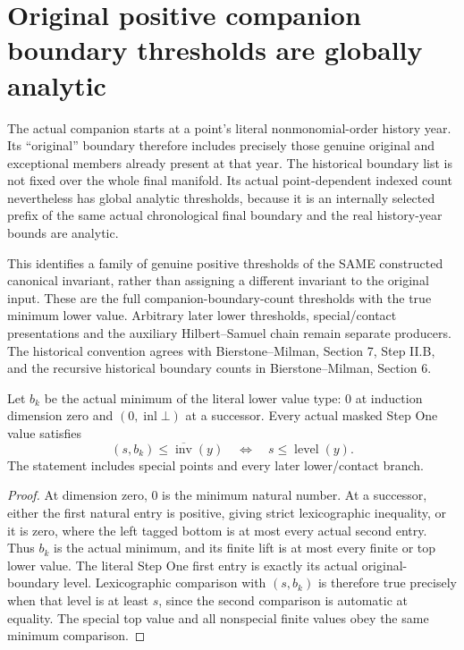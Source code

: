 \section{Original positive companion boundary thresholds are globally analytic}

The actual companion starts at a point's literal nonmonomial-order history
year. Its ``original'' boundary therefore includes precisely those genuine
original and exceptional members already present at that year. The historical
boundary list is not fixed over the whole final manifold. Its actual
point-dependent indexed count nevertheless has global analytic thresholds,
because it is an internally selected prefix of the same actual chronological
final boundary and the real history-year bounds are analytic.

This identifies a family of genuine positive thresholds of the SAME constructed
canonical invariant, rather than assigning a different invariant to the original
input. These are the full companion-boundary-count thresholds with the true
minimum lower value. Arbitrary later lower thresholds, special/contact
presentations and the auxiliary Hilbert--Samuel chain remain separate producers.
The historical convention agrees with Bierstone--Milman\cite{bierstone-milman08-functoriality},
Section 7, Step II.B, and the recursive historical boundary counts in
Bierstone--Milman\cite{bierstone-milman97-invent-math}, Section 6.

\begin{lemma}
\label{hir:original-companion-minimum-lower-threshold-level-dictionary}
\leanok
Let $b_k$ be the actual minimum of the literal lower value type: $0$ at
induction dimension zero and $(0,\operatorname{inl}\bot)$ at a successor.
Every actual masked Step One value satisfies
\[
 (s,b_k)\le \overline{\operatorname{inv}}(y)
 \quad\Longleftrightarrow\quad s\le\operatorname{level}(y).
\]
The statement includes special points and every later lower/contact branch.
\end{lemma}
\begin{proof}
At dimension zero, $0$ is the minimum natural number. At a successor, either
the first natural entry is positive, giving strict lexicographic inequality,
or it is zero, where the left tagged bottom is at most every actual second
entry. Thus $b_k$ is the actual minimum, and its finite lift is at most every
finite or top lower value. The literal Step One first entry is exactly its
actual original-boundary level. Lexicographic comparison with $(s,b_k)$
is therefore true precisely when that level is at least $s$, since the
second comparison is automatic at equality. The special top value and
all nonspecial finite values obey the same minimum comparison.
\end{proof}

